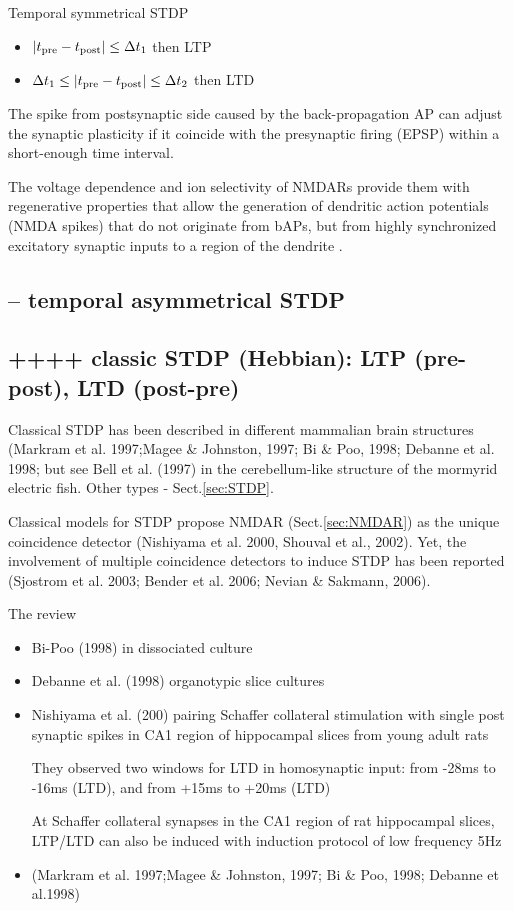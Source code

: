 Temporal symmetrical STDP
\begin{itemize}
  \item  $|t_{{\text{pre}}}-t_{{\text{post}}}| \le \Delta t_1$ then LTP
  \item $\Delta t_1 \le |t_{{\text{pre}}}-t_{{\text{post}}}| \le \Delta t_2$ then LTD
\end{itemize}

The spike from postsynaptic side caused by the back-propagation AP can adjust
the synaptic plasticity if it coincide with the presynaptic firing (EPSP) within
a short-enough time interval.

The voltage dependence and ion selectivity of NMDARs provide them with
regenerative properties that allow the generation of dendritic action potentials
(NMDA spikes) that do not originate from bAPs, but from highly synchronized
excitatory synaptic inputs to a region of the dendrite \citep{schiller2000,
schiller2001, enoki2004, gordon2006}.
  
  
\subsection{-- temporal asymmetrical STDP}

\subsection{++++ classic STDP (Hebbian): LTP (pre-post), LTD (post-pre)}
\label{sec:STDP-classic}


Classical STDP has been described in different mammalian brain structures
(Markram et al. 1997;Magee \& Johnston, 1997; Bi \& Poo, 1998; Debanne et al.
1998; but see Bell et al. (1997) in the cerebellum-like structure of the
mormyrid electric fish.
Other types - Sect.\ref{sec:STDP}.

Classical models for STDP propose NMDAR (Sect.\ref{sec:NMDAR}) as the unique
coincidence detector (Nishiyama et al. 2000, Shouval et al., 2002).
Yet, the involvement of multiple coincidence detectors to induce STDP has been
reported (Sjostrom et al. 2003; Bender et al. 2006; Nevian \& Sakmann, 2006).

The review \citep{bi2001}
\begin{itemize}
  \item Bi-Poo (1998) in dissociated culture
  \item Debanne et al. (1998) organotypic slice cultures 
  
  \item  Nishiyama et al. (200) pairing Schaffer collateral stimulation with
  single post synaptic spikes in CA1 region of hippocampal slices from young
  adult rats
  
  They observed two windows for LTD in homosynaptic input: from -28ms to -16ms
  (LTD), and from +15ms to +20ms (LTD)
  
  At Schaffer collateral synapses in the CA1 region of rat hippocampal
slices, LTP/LTD can also be induced with induction protocol of low frequency 5Hz

\item (Markram et al. 1997;Magee \& Johnston, 1997; Bi \& Poo, 1998; Debanne et
al.1998)

\end{itemize}

